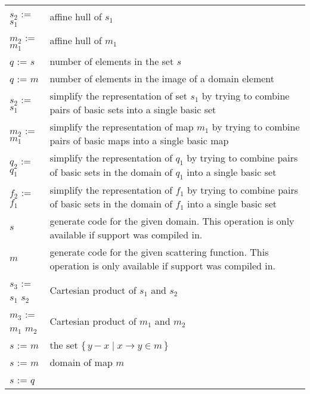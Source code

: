 \newpage
{}
\label{t:iscc}
\tablelasttail{}
\begin{supertabular}{p{0.35\textwidth}p{0.6\textwidth}}
$s_2$ :=  $s_1$ & affine hull of $s_1$
\\
$m_2$ :=  $m_1$ & affine hull of $m_1$
\\
$q$ :=  $s$ &
number of elements in the set $s$
\\
$q$ :=  $m$ &
number of elements in the image of a domain element
\\
$s_2$ :=  $s_1$ &
simplify the representation of set $s_1$ by trying
to combine pairs of basic sets into a single
basic set
\\
$m_2$ :=  $m_1$ &
simplify the representation of map $m_1$ by trying
to combine pairs of basic maps into a single
basic map
\\
$q_2$ :=  $q_1$ &
simplify the representation of $q_1$ by trying
to combine pairs of basic sets in the domain
of $q_1$ into a single basic set
\\
$f_2$ :=  $f_1$ &
simplify the representation of $f_1$ by trying
to combine pairs of basic sets in the domain
of $f_1$ into a single basic set
\\
 $s$ &
generate code for the given domain.
This operation is only available if 
support was compiled in.
\\
 $m$ &
generate code for the given scattering function.
This operation is only available if 
support was compiled in.
\\
$s_3$ := $s_1$  $s_2$ &
Cartesian product of $s_1$ and $s_2$
\\
$m_3$ := $m_1$  $m_2$ &
Cartesian product of $m_1$ and $m_2$
\\
$s$ :=  $m$ &
the set $\{\, y - x \mid x \to y \in m \,\}$
\\
$s$ :=  $m$ &
domain of map $m$
\\
$s$ :=  $q$ &

\end{supertabular}
